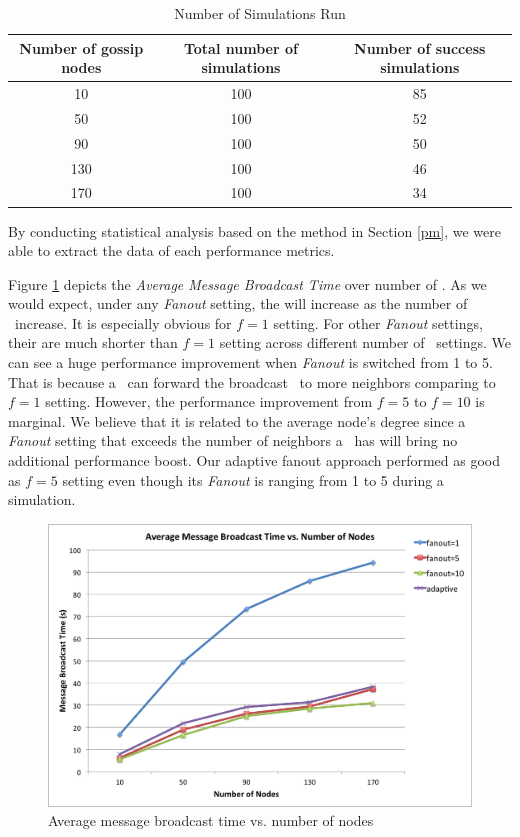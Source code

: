 \begin{table}[h]
	\centering
	\caption{Number of Simulations Run}
	\label{table:sim}
	\begin{tabular}{|c|c|c|}
		\hline 
		Number of gossip nodes & Total number of simulations & Number of success simulations \\ 
		\hline 
		10 & 100 & 85 \\ 
		\hline 
		50 & 100 & 52 \\ 
		\hline 
		90 & 100 & 50 \\ 
		\hline 
		130 & 100 & 46 \\ 
		\hline 
		170 & 100 & 34 \\ 
		\hline 
	\end{tabular} 
\end{table}

By conducting statistical analysis based on the method in Section \ref{pm}, we were able to extract the data of each performance metrics. 

Figure \ref{fig:brTime} depicts the \emph{Average Message Broadcast Time} over number of \gns. As we would expect, under any \emph{Fanout} setting, the \emph{\ambt} will increase as the number of \gns ~increase. It is especially obvious for $f=1$ setting. For other \emph{Fanout} settings, their \emph{\ambt} are much shorter than $f=1$ setting across different number of \gns ~settings. We can see a huge performance improvement when \emph{Fanout} is switched from 1 to 5. That is because a \gn ~can forward the broadcast \msg ~to more neighbors comparing to $f=1$ setting. However, the performance improvement from $f=5$ to $f=10$ is marginal. We believe that it is related to the average node's degree since a \emph{Fanout} setting that exceeds the number of neighbors a \gn ~has will bring no additional performance boost. Our adaptive fanout approach performed as good as $f=5$ setting even though its \emph{Fanout} is ranging from 1 to 5 during a simulation. 

\begin{figure} 
	\centering
	\includegraphics[width=5.5in]{brTime.png}
	\caption{Average message broadcast time vs. number of nodes}
	\label{fig:brTime}
\end{figure}

